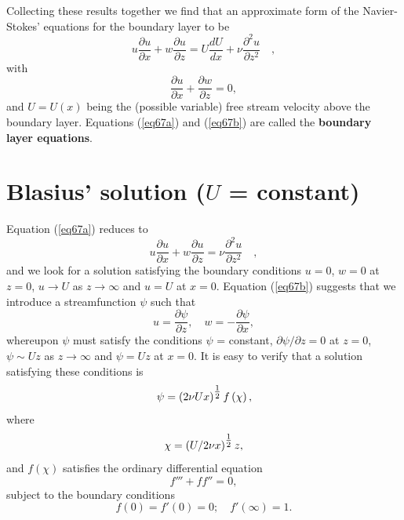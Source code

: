 \documentclass[twoside,a4paper,11pt]{report}
\begin{document}
Collecting these results together we find that an approximate form of the 
Navier-Stokes' equations for the boundary layer to be
\begin{equation}
\label{eq67a}
u\frac{\partial u}{\partial x}+w\frac{\partial u}{\partial 
z}=U\frac{dU}{dx}+\nu \frac{\partial ^2u}{\partial z^2}\quad ,
\end{equation}
with 
\begin{equation}
 \frac{\partial u}{\partial x}+\frac{\partial w}{\partial z}=0, \label{eq67b}  
\end{equation}
and $U = U(x)$ being the (possible variable) free stream velocity above the 
boundary layer. Equations (\ref{eq67a}) and (\ref{eq67b}) are called the \textbf{boundary 
layer equations}.

\section{Blasius' solution ($U$ = constant)}
Equation (\ref{eq67a}) reduces to
\begin{equation}
\label{eq68}
u\frac{\partial u}{\partial x}+w\frac{\partial u}{\partial z}=\nu 
\frac{\partial ^2u}{\partial z^2}\quad ,
\end{equation}
and we look for a solution satisfying the boundary conditions $u = 0$, $w = 0$ 
at $z = 0$, $u \to  U$ as $z \to \infty $ and $u = U$ at $x = 0$. Equation (\ref{eq67b}) 
suggests that we introduce a streamfunction $\psi $ such that
\[ u=\frac{\partial \psi }{\partial z}, \quad w=-\frac{\partial \psi }{\partial 
x}, \]
whereupon $\psi $ must satisfy the conditions $\psi $ = constant, $\partial 
\psi /\partial z = 0$ at $z = 0$, $\psi  \sim  Uz$ as $z \to \infty $ 
and $\psi  = Uz$ at $x = 0$. It is easy to verify that a solution satisfying 
these conditions is
\begin{equation}
\label{eq69}
\psi =\left( {2\nu Ux} \right)^{\textstyle{1 \over 2}}f\left( \chi \right),
\end{equation}
where
\begin{equation}
\label{eq610}
\chi =\left( {U/ {2\nu x}} \right)^{\textstyle{1 \over 2}}z,
\end{equation}
and $f(\chi )$ satisfies the ordinary differential equation
\begin{equation}
\label{eq611}
{f}'''+f{f}''=0,
\end{equation}
subject to the boundary conditions
\begin{equation}
f(0) = f'(0) = 0; \quad f'(\infty ) = 1 . \label{eq613} \end{equation}
\end{document}
